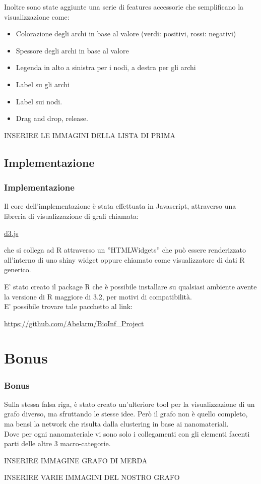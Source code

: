 \documentclass{beamer}
\begin{document}
\begin{frame}
Inoltre sono state aggiunte una serie di features accessorie che semplificano la visualizzazione come:
\begin{itemize}
\item Colorazione degli archi in base al valore (verdi: positivi, rossi: negativi)
\item Spessore degli archi in base al valore
\item Legenda in alto a sinistra per i nodi, a destra per gli archi
\item Label su gli archi
\item Label sui nodi.
\item Drag and drop, release.
\end{itemize}
\end{frame}

\begin{frame}
INSERIRE LE IMMAGINI DELLA LISTA DI PRIMA
\end{frame}

\subsection{Implementazione}
\begin{frame}
\frametitle{Implementazione}
Il core dell'implementazione è stata effettuata in Javascript, attraverso una libreria di visualizzazione  di grafi chiamata:
\begin{center}
\href{http://d3js.org/}{d3.js}
\end{center}
che si collega ad R attraverso un ''HTMLWidgets'' che può essere renderizzato all'interno di uno shiny widget oppure chiamato come visualizzatore di dati R generico.
\end{frame}

\begin{frame}
E' stato creato il package R che è possibile installare su qualsiasi ambiente avente la versione di R maggiore di 3.2, per motivi di compatibilità.\\
E' possibile trovare tale pacchetto al link:
\begin{center}
\url{https://github.com/Abelarm/BioInf_Project}
\end{center}
\end{frame}

\section{Bonus}
\begin{frame}
\frametitle{Bonus}
Sulla stessa falsa riga, è stato creato un'ulteriore tool per la visualizzazione di un grafo diverso, ma sfruttando le stesse idee. Però il grafo non è quello completo, ma bensì la network che risulta dalla clustering in base ai nanomateriali.\\
\medskip
Dove per ogni nanomateriale vi sono solo i collegamenti con gli elementi facenti parti delle altre 3 macro-categorie.
\end{frame}

\begin{frame}
INSERIRE IMMAGINE GRAFO DI MERDA
\end{frame}

\begin{frame}
INSERIRE VARIE IMMAGINI DEL NOSTRO GRAFO
\end{frame}
\end{document}
